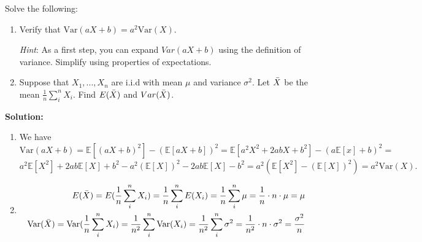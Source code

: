 \documentclass{harvardml}
\theoremstyle{definition}
\theoremstyle{plain}
\newcommand{\E}{\mathbb{E}}
\newcommand{\var}{\text{Var}}
\begin{document}
\begin{problem} Solve the following: 
\begin{enumerate} [label=(\alph*)] 
\item Verify that $\var(aX + b) = a^2\var(X)$.

\emph{Hint}: As a first step, you can expand $Var(aX + b)$ using the definition of variance.  Simplify using properties of expectations.
\item Suppose that $X_1, ..., X_n$ are i.i.d with mean $\mu$ and variance $\sigma^2$. Let $\Bar{X}$ be the mean $\frac{1}{n}\sum_i^n X_i$. Find $E(\Bar{X})$ and $Var(\Bar{X})$.
\end{enumerate}
\textbf{Solution:} 
\begin{enumerate} [label=(\alph*)] 
\item We have
$$
\var(aX+b) = \E[(aX+b)^2] - (\E[aX+b])^2 = \E[a^2X^2 + 2abX + b^2] - (a\E[x] + b)^2 = $$ $$
a^2\E[X^2] + 2ab\E[X] + b^2 - a^2(\E[X])^2 -2ab\E[X] - b^2 = a^2(\E[X^2] - (\E[X])^2) = a^2\var(X)
.$$
\item 
\begin{align*}
    E(\Bar{X}) = E(\frac{1}{n}\sum_i^n X_i) = \frac{1}{n}\sum_i^n E(X_i) = \frac{1}{n}\sum_i^n \mu = \frac{1}{n} \cdot n \cdot \mu = \mu \\ 
    \var(\Bar{X}) = \var(\frac{1}{n}\sum_i^n X_i) = \frac{1}{n^2}\sum_i^n \var(X_i) = \frac{1}{n^2}\sum_i^n \sigma^2 = \frac{1}{n^2} \cdot n \cdot \sigma^2 = \frac{\sigma^2}{n}
\end{align*}
\end{enumerate}
\end{problem}
		
		    
\end{document}
